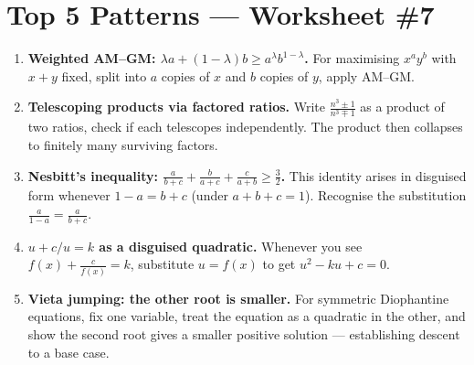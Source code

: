 \documentclass[11pt,a4paper]{article}
\begin{document}
\section*{Top 5 Patterns --- Worksheet \#7}
\begin{enumerate}[leftmargin=2em,itemsep=4pt]
  \item \textbf{Weighted AM--GM: $\lambda a+(1-\lambda)b\geq a^\lambda b^{1-\lambda}$.} For maximising $x^ay^b$ with $x+y$ fixed, split into $a$ copies of $x$ and $b$ copies of $y$, apply AM--GM. 
  \item \textbf{Telescoping products via factored ratios.} Write $\frac{n^3\pm1}{n^3\mp1}$ as a product of two ratios, check if each telescopes independently. The product then collapses to finitely many surviving factors. 
  \item \textbf{Nesbitt's inequality: $\frac{a}{b+c}+\frac{b}{a+c}+\frac{c}{a+b}\geq\frac{3}{2}$.} This identity arises in disguised form whenever $1-a=b+c$ (under $a+b+c=1$). Recognise the substitution $\frac{a}{1-a}=\frac{a}{b+c}$. 
  \item \textbf{$u+c/u=k$ as a disguised quadratic.} Whenever you see $f(x)+\frac{c}{f(x)}=k$, substitute $u=f(x)$ to get $u^2-ku+c=0$. 
  \item \textbf{Vieta jumping: the other root is smaller.} For symmetric Diophantine equations, fix one variable, treat the equation as a quadratic in the other, and show the second root gives a smaller positive solution --- establishing descent to a base case. 
\end{enumerate}
\end{document}
